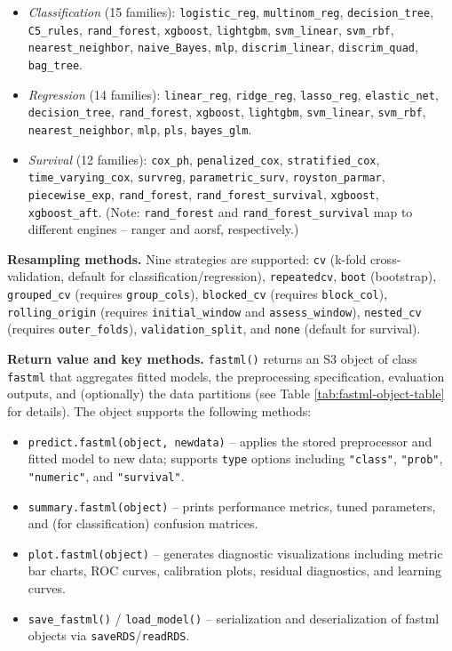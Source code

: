 \begin{itemize}
\tightlist
\item
  \emph{Classification} (15 families): \texttt{logistic\_reg}, \texttt{multinom\_reg}, \texttt{decision\_tree}, \texttt{C5\_rules}, \texttt{rand\_forest}, \texttt{xgboost}, \texttt{lightgbm}, \texttt{svm\_linear}, \texttt{svm\_rbf}, \texttt{nearest\_neighbor}, \texttt{naive\_Bayes}, \texttt{mlp}, \texttt{discrim\_linear}, \texttt{discrim\_quad}, \texttt{bag\_tree}.
\item
  \emph{Regression} (14 families): \texttt{linear\_reg}, \texttt{ridge\_reg}, \texttt{lasso\_reg}, \texttt{elastic\_net}, \texttt{decision\_tree}, \texttt{rand\_forest}, \texttt{xgboost}, \texttt{lightgbm}, \texttt{svm\_linear}, \texttt{svm\_rbf}, \texttt{nearest\_neighbor}, \texttt{mlp}, \texttt{pls}, \texttt{bayes\_glm}.
\item
  \emph{Survival} (12 families): \texttt{cox\_ph}, \texttt{penalized\_cox}, \texttt{stratified\_cox}, \texttt{time\_varying\_cox}, \texttt{survreg}, \texttt{parametric\_surv}, \texttt{royston\_parmar}, \texttt{piecewise\_exp}, \texttt{rand\_forest}, \texttt{rand\_forest\_survival}, \texttt{xgboost}, \texttt{xgboost\_aft}. (Note: \texttt{rand\_forest} and \texttt{rand\_forest\_survival} map to different engines -- ranger and aorsf, respectively.)
\end{itemize}

\textbf{Resampling methods.} Nine strategies are supported: \texttt{cv} (k-fold cross-validation, default for classification/regression), \texttt{repeatedcv}, \texttt{boot} (bootstrap), \texttt{grouped\_cv} (requires \texttt{group\_cols}), \texttt{blocked\_cv} (requires \texttt{block\_col}), \texttt{rolling\_origin} (requires \texttt{initial\_window} and \texttt{assess\_window}), \texttt{nested\_cv} (requires \texttt{outer\_folds}), \texttt{validation\_split}, and \texttt{none} (default for survival).

\textbf{Return value and key methods.} \texttt{fastml()} returns an S3 object of class \texttt{fastml} that aggregates fitted models, the preprocessing specification, evaluation outputs, and (optionally) the data partitions (see Table \ref{tab:fastml-object-table} for details). The object supports the following methods:

\begin{itemize}
\tightlist
\item
  \texttt{predict.fastml(object,\ newdata)} -- applies the stored preprocessor and fitted model to new data; supports \texttt{type} options including \texttt{"class"}, \texttt{"prob"}, \texttt{"numeric"}, and \texttt{"survival"}.
\item
  \texttt{summary.fastml(object)} -- prints performance metrics, tuned parameters, and (for classification) confusion matrices.
\item
  \texttt{plot.fastml(object)} -- generates diagnostic visualizations including metric bar charts, ROC curves, calibration plots, residual diagnostics, and learning curves.
\item
  \texttt{save\_fastml()} / \texttt{load\_model()} -- serialization and deserialization of fastml objects via \texttt{saveRDS}/\texttt{readRDS}.
\end{itemize}

